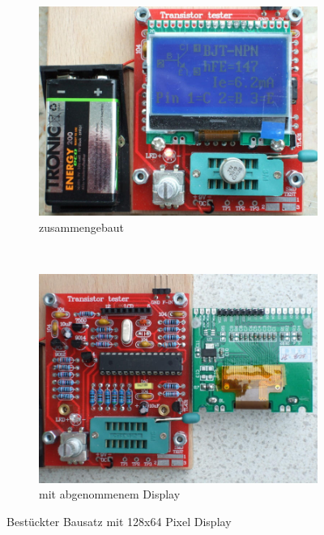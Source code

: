 \begin{figure}[H]
  \begin{subfigure}[b]{.5\textwidth}	%
    \centering
    \includegraphics[width=1.\textwidth]{../PNG/Kit_ST7565a.jpg}	%
    \caption{zusammengebaut}
  \end{subfigure}
~
  \begin{subfigure}[b]{.5\textwidth}	%
    \centering
    \includegraphics[width=1.\textwidth]{../PNG/Kit_ST7565b.jpg}	%
    \caption{mit abgenommenem Display}
  \end{subfigure}
  \caption{Bestückter Bausatz mit 128x64 Pixel Display}
\label{fig:Kit_mono}
\end{figure}

